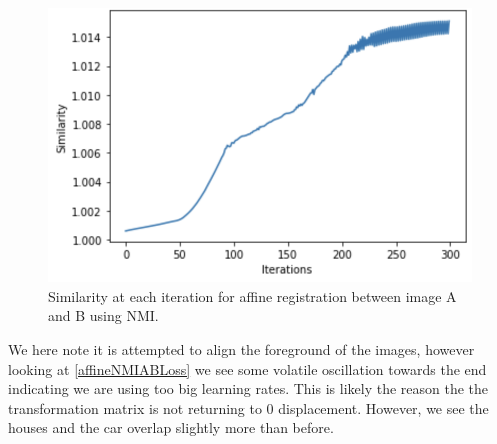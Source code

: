 \begin{figure}[h]
	\centering
	\includegraphics[width=0.4\linewidth]{Materials/affineNMIABLoss}
	\caption{Similarity at each iteration for affine registration between image A and B using NMI.}
	\label{affineNMIABLoss}
\end{figure}
We here note it is attempted to align the foreground of the images, however looking at \autoref{affineNMIABLoss} we see some volatile oscillation towards the end indicating we are using too big learning rates. This is likely the reason the the transformation matrix is not returning to 0 displacement. However, we see the houses and the car overlap slightly more than before. 